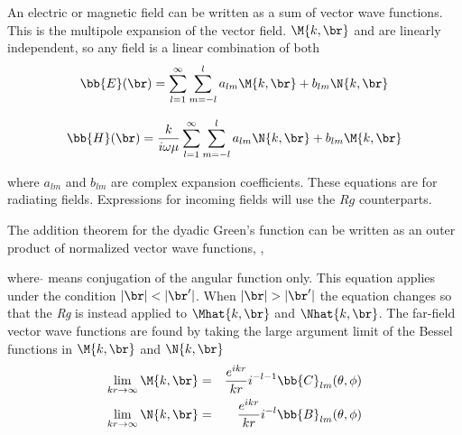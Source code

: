 An electric or magnetic field can be written as a sum of vector wave functions. This is the multipole expansion of the vector field.  $ \M{k,\br}$ and  are linearly independent, so any field is a linear combination of both 
\begin{equation}
\bb{E}(\br) = \sum_{l=1}^{\infty}\sum_{m=-l}^l a_{lm} \M{k,\br} + b_{lm} \N{k,\br}
\end{equation}

\begin{equation}
\bb{H}(\br) = \dfrac{k}{i\omega\mu}\sum_{l=1}^{\infty}\sum_{m=-l}^l a_{lm} \N{k,\br} + b_{lm} \M{k,\br} \label{Halmblm}
\end{equation}

\noindent where $a_{lm}$ and $b_{lm}$ are complex expansion coefficients. These equations are for radiating fields. Expressions for incoming fields will use the $\textit{Rg}$ counterparts.  

The addition theorem for the dyadic Green's function can be written as an outer product of normalized vector wave functions, \cite{chew1995waves},

\noindent where $\hat{}$ means conjugation of the angular function only. This equation applies under the condition $\vert \br \vert < \vert \br' \vert$. When $\vert \br \vert > \vert \br' \vert$ the equation changes so that the \textit{Rg} is instead applied to $\Mhat{k,\br}$ and $\Nhat{k,\br}$. The far-field vector wave functions are found by taking the large argument limit of the Bessel functions in $\M{k,\br}$ and $\N{k,\br}$
\begin{eqnarray}
\lim_{kr \rightarrow \infty} \M{k,\br} &=& \dfrac{e^{ikr}}{kr} i^{-l-1} \bb{C}_{lm}(\theta,\phi) \label{farfieldM} \\
\lim_{kr \rightarrow \infty} \N{k,\br} &=& \dfrac{e^{ikr}}{kr} i^{-l} \bb{B}_{lm}(\theta,\phi) \label{farfieldN}
\end{eqnarray}

